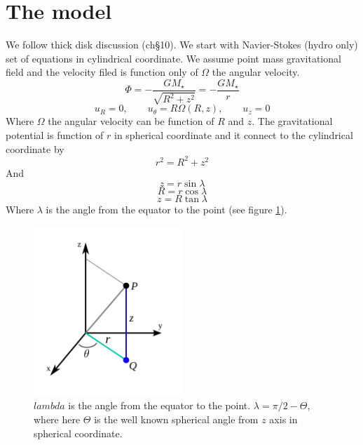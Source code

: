 \documentclass[12pt, a4paper]{article}
\begin{document}
\section{The model}
We follow \cite{2002apa..book.....F} thick disk discussion (ch\S10).
We start with Navier-Stokes (hydro only) set of equations in cylindrical coordinate.
We assume point mass gravitational field and the velocity filed is function only of $\Omega$ the angular velocity.
\begin{equation}
    \Phi = -\frac{G M_\star}{\sqrt{R^2+z^2}} = -\frac{G M_\star}{r}
\end{equation}
\begin{equation}
    u_R=0, \qquad u_\theta=R\Omega(R,z), \qquad u_z=0
\end{equation}
Where $\Omega$ the angular velocity can be function of $R$ and $z$.
The gravitational potential is function of $r$ in spherical coordinate and it connect to the cylindrical coordinate by 
\begin{equation}
    r^2=R^2+z^2
\end{equation} 
And
\begin{equation}
    z=r\sin\lambda
\end{equation}
\begin{equation}
    R=r\cos\lambda
\end{equation}
\begin{equation}
    z=R\tan\lambda
\end{equation}
Where $\lambda$ is the angle from the equator to the point (see figure \ref{fig:def-lambda}).
\begin{figure}[ht!]
    \begin{center}
        \includegraphics[width=0.5\textwidth]{lambda_theta_cyl_coor.png}
    \end{center}
    \caption{
        $lambda$ is the angle from the equator to the point. $\lambda = \pi/2 - \Theta$, where here $\Theta$ is the well known spherical angle from $z$ axis in spherical coordinate. 
    }\label{fig:def-lambda}
\end{figure}
\end{document}
